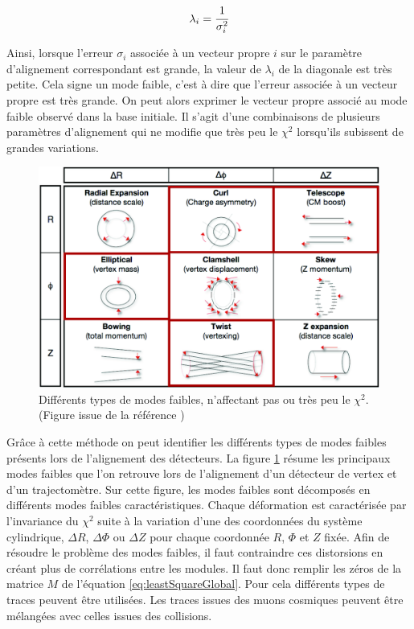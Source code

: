    \begin{equation}
    \lambda_i = \cfrac{1}{\sigma_i^2}
   \end{equation}

   Ainsi, lorsque l'erreur $\sigma_i$ associ\'ee \`a un vecteur propre $i$ sur le param\`etre d'alignement correspondant est grande, la valeur de $\lambda_i$ de la diagonale est tr\`es petite. Cela signe un mode faible, c'est \`a dire que l'erreur associ\'ee \`a un vecteur propre est tr\`es grande. On peut alors exprimer le vecteur propre associ\'e au mode faible observ\'e dans la base initiale. Il s'agit d'une combinaisons de plusieurs param\`etres d'alignement qui ne modifie que tr\`es peu le $\chi^2$ lorsqu'ils subissent de grandes variations.
  
  \begin{figure}[!htb]
    \begin{center}
      \includegraphics[scale=0.32]{./figures/weak_modes.png}
      \caption{Diff\'erents types de modes faibles, n'affectant pas ou tr\`es peu le $\chi^2$. (Figure issue de la r\'ef\'erence \cite{Escobar:2008zz})}
      \label{fig:weak_modes}
    \end{center}
  \end{figure} 
  
   \medskip
   
   Gr\^ace \`a cette m\'ethode on peut identifier les diff\'erents types de modes faibles pr\'esents lors de l'alignement des d\'etecteurs. La figure \ref{fig:weak_modes} r\'esume les principaux modes faibles que l'on retrouve lors de l'alignement d'un d\'etecteur de vertex et d'un trajectom\`etre. Sur cette figure, les modes faibles sont d\'ecompos\'es en diff\'erents modes faibles caract\'eristiques. Chaque d\'eformation est caract\'eris\'ee par l'invariance du $\chi^2$ suite \`a la variation d'une des coordonn\'ees du syst\`eme cylindrique, $\Delta R$, $\Delta \Phi$ ou $\Delta Z$ pour chaque coordonn\'ee $R$, $\Phi$ et $Z$ fix\'ee. Afin de r\'esoudre le probl\`eme des modes faibles, il faut contraindre ces distorsions en cr\'eant plus de corrélations entre les modules. Il faut donc remplir les z\'eros de la matrice $M$ de l'\'equation \ref{eq:leastSquareGlobal}. Pour cela différents types de traces peuvent \^etre utilis\'ees. Les traces issues des muons cosmiques peuvent \^etre m\'elang\'ees avec celles issues des collisions. 
   
